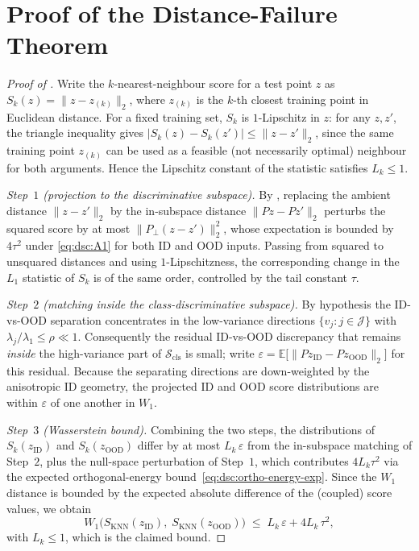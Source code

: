 \section{Proof of the Distance-Failure Theorem}
\label{sec:dsc-proofs:thm}

\begin{proof}[Proof of ]
Write the $k$-nearest-neighbour score for a test point $z$ as
$S_k(z) = \|z - z_{(k)}\|_2$, where $z_{(k)}$ is the $k$-th closest training
point in Euclidean distance. For a fixed training set, $S_k$ is $1$-Lipschitz in
$z$: for any $z, z'$, the triangle inequality gives
$|S_k(z) - S_k(z')| \le \|z - z'\|_2$, since the same training point $z_{(k)}$
can be used as a feasible (not necessarily optimal) neighbour for both
arguments. Hence the Lipschitz constant of the statistic satisfies
$L_k \le 1$.

\emph{Step~$1$ (projection to the discriminative subspace).}
By , replacing the ambient distance $\|z - z'\|_2$ by
the in-subspace distance $\|Pz - Pz'\|_2$ perturbs the squared score by at most
$\|P_\perp(z - z')\|_2^2$, whose expectation is bounded by $4\tau^2$ under
\eqref{eq:dsc:A1} for both ID and OOD inputs. Passing from squared to unsquared
distances and using $1$-Lipschitzness, the corresponding change in the $L_1$
statistic of $S_k$ is of the same order, controlled by the tail constant
$\tau$.

\emph{Step~$2$ (matching inside the class-discriminative subspace).}
By hypothesis the ID-vs-OOD separation concentrates in the low-variance
directions $\{v_j : j \in \mathcal{J}\}$ with
$\lambda_j/\lambda_1 \le \rho \ll 1$. Consequently the residual ID-vs-OOD
discrepancy that remains \emph{inside} the high-variance part of
$\mathcal{S}_{\mathrm{cls}}$ is small; write
$\varepsilon = \mathbb{E}\bigl[\|P z_{\mathrm{ID}} - P z_{\mathrm{OOD}}\|_2\bigr]$
for this residual. Because the separating directions are down-weighted by the
anisotropic ID geometry, the projected ID and OOD score distributions are within
$\varepsilon$ of one another in $W_1$.

\emph{Step~$3$ (Wasserstein bound).}
Combining the two steps, the distributions of $S_k(z_{\mathrm{ID}})$ and
$S_k(z_{\mathrm{OOD}})$ differ by at most $L_k\,\varepsilon$ from the in-subspace
matching of Step~$2$, plus the null-space perturbation of Step~$1$, which
contributes $4 L_k \tau^2$ via the expected orthogonal-energy
bound~\eqref{eq:dsc:ortho-energy-exp}. Since the $W_1$ distance is bounded by the
expected absolute difference of the (coupled) score values, we obtain
\begin{equation} W_1\!\bigl(S_{\mathrm{KNN}}(z_{\mathrm{ID}}),\; S_{\mathrm{KNN}}(z_{\mathrm{OOD}})\bigr) \;\le\; L_k\,\varepsilon + 4 L_k\,\tau^2 , \label{eq:dsc:knn-fail} \end{equation}
with $L_k \le 1$, which is the claimed bound.
\end{proof}

